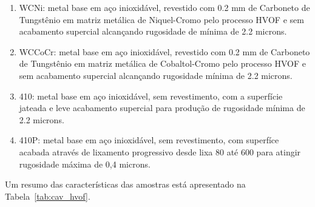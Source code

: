 \begin{enumerate}
  \item WCNi: metal base em aço inioxidável, revestido com 0.2 mm de Carboneto  
  de Tungstênio em   matriz metálica de Niquel-Cromo pelo processo HVOF e sem
  acabamento supercial alcançando rugosidade de mínima de 2.2 microns.
  \item WCCoCr: metal base em aço inioxidável, revestido com 0.2 mm de
  Carboneto de Tungstênio em   matriz metálica de Cobaltol-Cromo pelo processo
  HVOF e sem acabamento supercial alcançando rugosidade mínima de 2.2 microns.
  \item 410: metal base em aço inioxidável, sem revestimento, com a superfície
  jateada e leve  acabamento supercial para produção de rugosidade mínima de
  2.2 microns.
  \item 410P: metal base em aço inioxidável, sem revestimento, com superfíce
  acabada através de lixamento progressivo desde lixa 80 até 600 para atingir
  rugosidade máxima de 0,4 microns.
\end{enumerate}
 
 Um resumo das características das amostras está apresentado na
 Tabela~\ref{tab:cav_hvof}.
 
